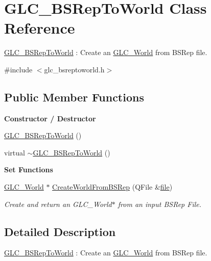 \hypertarget{class_g_l_c___b_s_rep_to_world}{\section{G\-L\-C\-\_\-\-B\-S\-Rep\-To\-World Class Reference}
\label{class_g_l_c___b_s_rep_to_world}
}


\hyperlink{class_g_l_c___b_s_rep_to_world}{G\-L\-C\-\_\-\-B\-S\-Rep\-To\-World} \-: Create an \hyperlink{class_g_l_c___world}{G\-L\-C\-\_\-\-World} from B\-S\-Rep file.  




{\ttfamily \#include $<$glc\-\_\-bsreptoworld.\-h$>$}

\subsection*{Public Member Functions}
\begin{Indent}{\bf Constructor / Destructor}\par
\begin{DoxyCompactItemize}
\item 
\hyperlink{class_g_l_c___b_s_rep_to_world_afee1ccc6dfdc6462d8004b9b3bc7e35e}{G\-L\-C\-\_\-\-B\-S\-Rep\-To\-World} ()
\item 
virtual \hyperlink{class_g_l_c___b_s_rep_to_world_a501c70711bb0821ceacb145ff5532414}{$\sim$\-G\-L\-C\-\_\-\-B\-S\-Rep\-To\-World} ()
\end{DoxyCompactItemize}
\end{Indent}
\begin{Indent}{\bf Set Functions}\par
\begin{DoxyCompactItemize}
\item 
\hyperlink{class_g_l_c___world}{G\-L\-C\-\_\-\-World} $\ast$ \hyperlink{class_g_l_c___b_s_rep_to_world_aeed9b8468811f2ab8e38a66d5b5e3b83}{Create\-World\-From\-B\-S\-Rep} (Q\-File \&\hyperlink{uavobjecttemplate_8m_a97c04efa65bcf0928abf9260bc5cbf46}{file})
\begin{DoxyCompactList}\small\item\em Create and return an G\-L\-C\-\_\-\-World$\ast$ from an input B\-S\-Rep File. \end{DoxyCompactList}\end{DoxyCompactItemize}
\end{Indent}


\subsection{Detailed Description}
\hyperlink{class_g_l_c___b_s_rep_to_world}{G\-L\-C\-\_\-\-B\-S\-Rep\-To\-World} \-: Create an \hyperlink{class_g_l_c___world}{G\-L\-C\-\_\-\-World} from B\-S\-Rep file. 

